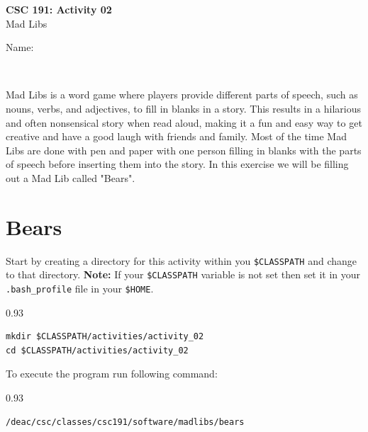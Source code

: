 \documentclass[10pt, twoside]{article}
\newcounter{qcnt}
\newcounter{sqcnt}
\begin{document}
\setcounter{qcnt}{1}
\setcounter{sqcnt}{1}
\parbox{3.0in}{{\large \textbf{CSC 191: Activity 02}}\\Mad Libs\\}\hfill
\parbox{3.0in}{Name: \hrulefill \vspace{6pt} \\} \\\hrulefill

Mad Libs is a word game where players provide different parts of speech, such as nouns, verbs, and adjectives, to fill in blanks in a story. This results in a hilarious and often nonsensical story when read aloud, making it a fun and easy way to get creative and have a good laugh with friends and family. Most of the time Mad Libs are done with pen and paper with one person filling in blanks with the parts of speech before inserting them into the story. In this exercise we will be filling out a Mad Lib called "Bears". 

\section{Bears}

Start by creating a directory for this activity within you \texttt{\$CLASSPATH} and change to that directory. \newline \textbf{Note:} If your \texttt{\$CLASSPATH} variable is not set then set it in your \texttt{.bash\_profile} file in your \texttt{\$HOME}.

\vspace{0.1in}

\begin{boxedminipage}[]{0.93\textwidth}
\begin{verbatim}
mkdir $CLASSPATH/activities/activity_02
cd $CLASSPATH/activities/activity_02
\end{verbatim}
\end{boxedminipage}
\newline

To execute the program run following command:

\vspace{0.1in}

\begin{boxedminipage}[]{0.93\textwidth}
\begin{verbatim}
/deac/csc/classes/csc191/software/madlibs/bears
\end{verbatim}
\end{boxedminipage}
\newline
\end{document}

